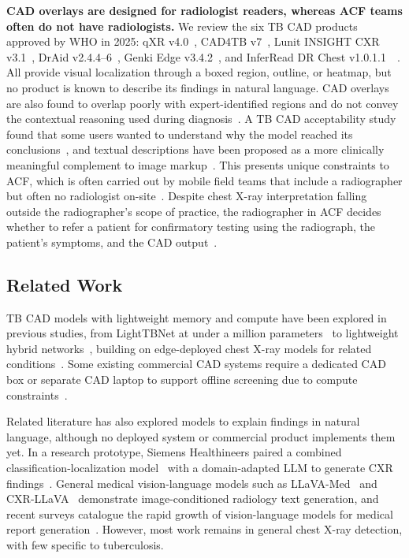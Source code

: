 \documentclass[conference, letterpaper]{IEEEtran}
\begin{document}
\textbf{CAD overlays are designed for radiologist readers, whereas ACF teams often do not have radiologists.} We review the six TB CAD products approved by WHO in 2025: qXR v4.0~\cite{qxr_docs}, CAD4TB v7~\cite{cad4tb_product}, Lunit INSIGHT CXR v3.1~\cite{lunit_product}, DrAid v2.4.4--6~\cite{draid_product}, Genki Edge v3.4.2~\cite{genki_product}, and InferRead DR Chest v1.0.1.1~\cite{inferread_product}~\cite{who_cad_approval_2025}. All provide visual localization through a boxed region, outline, or heatmap, but no product is known to describe its findings in natural language. CAD overlays are also found to overlap poorly with expert-identified regions and do not convey the contextual reasoning used during diagnosis~\cite{chen2022xai_human_centered}. A TB CAD acceptability study found that some users wanted to understand why the model reached its conclusions~\cite{hua2025qxr_acceptability}, and textual descriptions have been proposed as a more clinically meaningful complement to image markup~\cite{ihongbe2024xai_cxr, borys2023xai_beyond_saliency, siemens_llm_cxr_2023, gaube2024care_explain}. This presents unique constraints to ACF, which is often carried out by mobile field teams that include a radiographer but often no radiologist on-site~\cite{find_cad_landscape}. Despite chest X-ray interpretation falling outside the radiographer's scope of practice, the radiographer in ACF decides whether to refer a patient for confirmatory testing using the radiograph, the patient's symptoms, and the CAD output~\cite{stoptb_cad_guide}.

\subsection{Related Work}

TB CAD models with lightweight memory and compute have been explored in previous studies, from LightTBNet at under a million parameters~\cite{capellan2023lighttbnet} to lightweight hybrid networks~\cite{owda2025hybrid_tb}, building on edge-deployed chest X-ray models for related conditions~\cite{benmalek2025edge, chauhan2024covid_edge}. Some existing commercial CAD systems require a dedicated CAD box or separate CAD laptop to support offline screening due to compute constraints~\cite{stoptb_cad_guide}.

Related literature has also explored models to explain findings in natural language, although no deployed system or commercial product implements them yet. In a research prototype, Siemens Healthineers paired a combined classification-localization model~\cite{ghesu2022ssl_medical} with a domain-adapted LLM to generate CXR findings~\cite{siemens_llm_cxr_2023}. General medical vision-language models such as LLaVA-Med~\cite{li2023llava_med} and CXR-LLaVA~\cite{lee2024cxr_llava} demonstrate image-conditioned radiology text generation, and recent surveys catalogue the rapid growth of vision-language models for medical report generation~\cite{bazi2024vlm_review}. However, most work remains in general chest X-ray detection, with few specific to tuberculosis.
\end{document}
